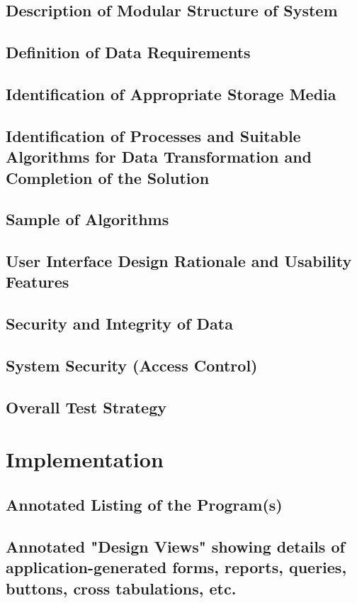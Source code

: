\documentclass[11pt]{article}
\begin{document}
        \subsection{Description of Modular Structure of System}
        \subsection{Definition of Data Requirements}
        \subsection{Identification of Appropriate Storage Media}
        \subsection{Identification of Processes and Suitable Algorithms for Data Transformation and Completion of the Solution}
        \subsection{Sample of Algorithms}
        \subsection{User Interface Design Rationale and Usability Features}
        \subsection{Security and Integrity of Data}
        \subsection{System Security (Access Control)}
        \subsection{Overall Test Strategy}

    \section{Implementation}
        \subsection{Annotated Listing of the Program(s)}
        \subsection{Annotated "Design Views" showing details of application-generated forms, reports, queries, buttons, cross tabulations, etc.}
\end{document}
